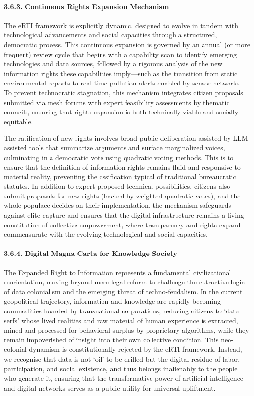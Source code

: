 \paragraph{3.6.3. Continuous Rights Expansion
Mechanism}\label{continuous-rights-expansion-mechanism}

The eRTI framework is explicitly dynamic, designed to evolve in tandem
with technological advancements and social capacities through a
structured, democratic process. This continuous expansion is governed by
an annual (or more frequent) review cycle that begins with a capability
scan to identify emerging technologies and data sources, followed by a
rigorous analysis of the new information rights these capabilities
imply---such as the transition from static environmental reports to
real-time pollution alerts enabled by sensor networks. To prevent
technocratic stagnation, this mechanism integrates citizen proposals
submitted via mesh forums with expert feasibility assessments by
thematic councils, ensuring that rights expansion is both technically
viable and socially equitable.

The ratification of new rights involves broad public deliberation
assisted by LLM-assisted tools that summarize arguments and surface
marginalized voices, culminating in a democratic vote using quadratic
voting methods. This is to ensure that the definition of information
rights remains fluid and responsive to material reality, preventing the
ossification typical of traditional bureaucratic statutes. In addition
to expert proposed technical possibilities, citizens also submit
proposals for new rights (backed by weighted quadratic votes), and the
whole populace decides on their implementation, the mechanism safeguards
against elite capture and ensures that the digital infrastructure
remains a living constitution of collective empowerment, where
transparency and rights expand commensurate with the evolving
technological and social capacities.

\paragraph{3.6.4. Digital Magna Carta for Knowledge
Society}\label{digital-magna-carta-for-knowledge-society}

The Expanded Right to Information represents a fundamental
civilizational reorientation, moving beyond mere legal reform to
challenge the extractive logic of data colonialism and the emerging
threat of techno-feudalism. In the current geopolitical trajectory,
information and knowledge are rapidly becoming commodities hoarded by
transnational corporations, reducing citizens to `data serfs' whose
lived realities and raw material of human experience is extracted, mined
and processed for behavioral surplus by proprietary algorithms, while
they remain impoverished of insight into their own collective condition.
This neo-colonial dynamism is constitutionally rejected by the eRTI
framework. Instead, we recognise that data is not `oil' to be drilled
but the digital residue of labor, participation, and social existence,
and thus belongs inalienably to the people who generate it, ensuring
that the transformative power of artificial intelligence and digital
networks serves as a public utility for universal upliftment.

